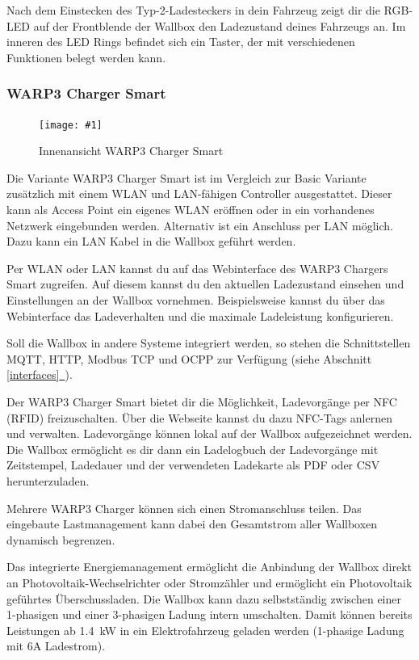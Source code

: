 \documentclass[a4paper,10pt]{article}
\newcommand{\gfx}[1]{\texttt{[image: \#1]}}
\newcommand*{\fullref}[1]{Abschnitt \hyperref[{#1}]{\ref*{#1}~\nameref*{#1}}}
\begin{document}
\begin{multicols*}{2}
    \vspace{-0.1cm}
    Nach dem Einstecken des Typ-2-Ladesteckers in
    dein Fahrzeug zeigt dir die RGB-LED auf der Frontblende der Wallbox den
    Ladezustand deines Fahrzeugs an. Im inneren des LED Rings befindet sich ein Taster,
	der mit verschiedenen Funktionen belegt werden kann.

	\subsubsection*{WARP3 Charger Smart}
    \begin{figure}[H]
        \gfx{./img_warp3/resized/warp3_smart_open}
        \caption*{Innenansicht WARP3 Charger Smart}
    \end{figure}
    Die Variante WARP3 Charger Smart ist im Vergleich zur Basic Variante zusätzlich 
	mit einem WLAN und LAN-fähigen Controller ausgestattet.
    Dieser kann als \nohyphens{Access} Point ein eigenes WLAN eröffnen oder in
    ein vorhandenes Netzwerk eingebunden werden. Alternativ ist ein Anschluss
    per LAN möglich. Dazu kann ein LAN Kabel in die Wallbox geführt werden.

    Per WLAN oder LAN kannst du auf das Webinterface des WARP3 Chargers Smart
    zugreifen. Auf diesem kannst du den aktuellen Ladezustand einsehen und
    Einstellungen an der Wallbox vornehmen. Beispielsweise kannst du über das Webinterface
    das Ladeverhalten und die maximale Ladeleistung konfigurieren.

	Soll die Wallbox in andere Systeme integriert werden, so stehen die
	Schnittstellen MQTT, HTTP, Modbus TCP und OCPP zur Verfügung 
	(siehe \fullref{interfaces}).

    Der WARP3 Charger Smart bietet dir die Möglichkeit, Ladevorgänge
    per NFC (RFID) freizuschalten. Über die Webseite kannst du dazu NFC-Tags
    anlernen und verwalten. Ladevorgänge können lokal auf der Wallbox
	aufgezeichnet werden. Die Wallbox ermöglicht es dir dann ein Ladelogbuch der
	Ladevorgänge mit Zeitstempel, Ladedauer und der verwendeten Ladekarte
	als PDF oder CSV herunterzuladen.

	Mehrere WARP3 Charger können sich einen Stromanschluss teilen.
	Das eingebaute Lastmanagement kann dabei den Gesamtstrom aller
	Wallboxen dynamisch begrenzen.

	Das integrierte Energiemanagement ermöglicht die Anbindung der Wallbox
	direkt an Photovoltaik-Wechselrichter oder Stromzähler und ermöglicht ein
	Photovoltaik geführtes Überschussladen. Die Wallbox kann dazu selbstständig
	zwischen einer 1-phasigen und einer 3-phasigen Ladung intern umschalten.
	Damit können bereits Leistungen ab \SI{1,4}{\kilo\watt} in ein Elektrofahrzeug geladen
	werden (1-phasige Ladung mit 6A Ladestrom).


\end{multicols*}
\end{document}
